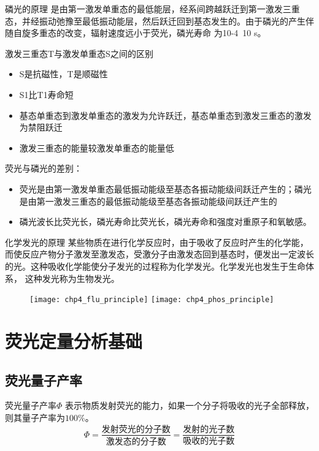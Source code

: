 \begin{definition*}{磷光的原理}
	是由第一激发单重态的最低能层，经系间跨越跃迁到第一激发三重态，并经振动弛豫至最低振动能层，然后跃迁回到基态发生的。由于磷光的产生伴随自旋多重态的改变，辐射速度远小于荧光，磷光寿命 为10-4~10 s。
\end{definition*}
激发三重态T与激发单重态S之间的区别
\begin{itemize}
	\item S是抗磁性，T是顺磁性
	\item S1比T1寿命短
	\item 基态单重态到激发单重态的激发为允许跃迁，基态单重态到激发三重态的激发为禁阻跃迁
	\item 激发三重态的能量较激发单重态的能量低
\end{itemize}
\begin{note}
	荧光与磷光的差别：
	\begin{itemize}
		\item 荧光是由第一激发单重态最低振动能级至基态各振动能级间跃迁产生的；磷光是由第一激发三重态的最低振动能级至基态各振动能级间跃迁产生的
		\item 磷光波长比荧光长，磷光寿命比荧光长，磷光寿命和强度对重原子和氧敏感。
	\end{itemize}
\end{note}
\begin{definition*}{化学发光的原理}
	某些物质在进行化学反应时，由于吸收了反应时产生的化学能，而使反应产物分子激发至激发态，受激分子由激发态回到基态时，便发出一定波长的光。这种吸收化学能使分子发光的过程称为化学发光。化学发光也发生于生命体系， 这种发光称为生物发光。
\end{definition*}
\begin{figure}
	\centering
	\texttt{[image: chp4\_flu\_principle]}
	\label{fig:chp4fluprinciple}
	\texttt{[image: chp4\_phos\_principle]}
	\label{fig:chp4phosprinciple}
	\caption{}
\end{figure}



\section{荧光定量分析基础}
\subsection{荧光量子产率}

\begin{definition*}{荧光量子产率$\Phi$}{}
	 表示物质发射荧光的能力，如果一个分子将吸收的光子全部释放，则其量子产率为$100\%$。
	\begin{equation*}
		\Phi =\frac{\text{发射荧光的分子数}}{\text{激发态的分子数}}=\frac{\text{发射的光子数}}{\text{吸收的光子数}}
	\end{equation*}
\end{definition*}

